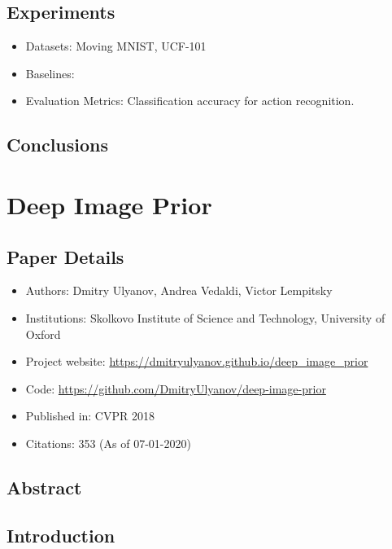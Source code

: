 \documentclass{article}
\begin{document}
    \subsection{Experiments}\label{subsec:Transformation_based_Models_of_Video_Sequences:experiments}
    \begin{itemize}
        \item Datasets: Moving MNIST, UCF-101
        \item Baselines:
        \item Evaluation Metrics: Classification accuracy for action recognition.
    \end{itemize}

    \subsection{Conclusions}\label{subsec:Transformation_based_Models_of_Video_Sequences:conclusions}
    \newpage


    \section{Deep Image Prior}\label{sec:Deep_Image_Prior}
    \subsection*{Paper Details}
    \begin{itemize}
        \item Authors: Dmitry Ulyanov, Andrea Vedaldi, Victor Lempitsky
        \item Institutions: Skolkovo Institute of Science and Technology, University of Oxford
        \item Project website: \url{https://dmitryulyanov.github.io/deep_image_prior}
        \item Code: \url{https://github.com/DmitryUlyanov/deep-image-prior}
        \item Published in: CVPR 2018
        \item Citations: 353 (As of 07-01-2020)
    \end{itemize}

    \subsection*{Abstract}

    \subsection{Introduction}\label{subsec:Deep_Image_Prior:introduction}
\end{document}
